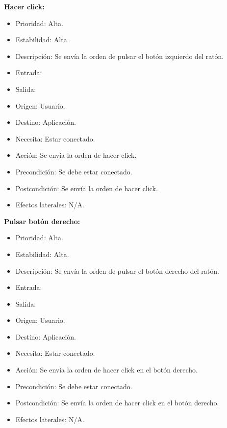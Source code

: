 \textbf{Hacer click:}
\begin{itemize}
\item Prioridad: Alta.
\item Estabilidad: Alta.
\item Descripción: Se envía la orden de pulsar el botón izquierdo del ratón.
\item Entrada:
\item Salida:
\item Origen: Usuario.
\item Destino: Aplicación.
\item Necesita: Estar conectado.
\item Acción: Se envía la orden de hacer click.
\item Precondición: Se debe estar conectado.
\item Postcondición: Se envía la orden de hacer click.
\item Efectos laterales: N/A.\\

\end{itemize}
\newpage
\textbf{Pulsar botón derecho:}
\begin{itemize}
\item Prioridad: Alta.
\item Estabilidad: Alta.
\item Descripción: Se envía la orden de pulsar el botón derecho del ratón.
\item Entrada:
\item Salida:
\item Origen: Usuario.
\item Destino: Aplicación.
\item Necesita: Estar conectado.
\item Acción: Se envía la orden de hacer click en el botón derecho.
\item Precondición: Se debe estar conectado.
\item Postcondición: Se envía la orden de hacer click en el botón derecho.
\item Efectos laterales: N/A.\\

\end{itemize}

